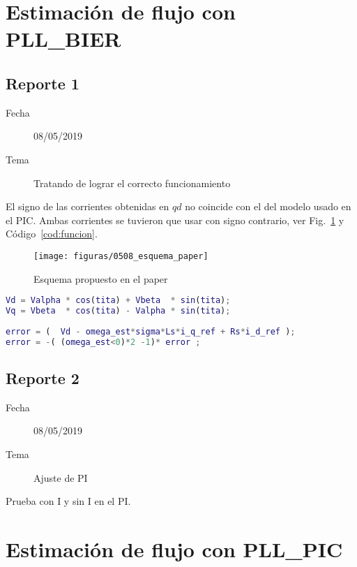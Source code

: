 \documentclass{article}
\begin{document}
	\section{Estimación de flujo con PLL\_BIER}
	
		
		\subsection{Reporte 1}
		\begin{description}
			\item[Fecha]  08/05/2019 
			\item[Tema] Tratando de lograr el correcto funcionamiento
		\end{description}
	
	
		El signo de las corrientes obtenidas en $qd$ no coincide con el del modelo usado en el PIC. Ambas corrientes se tuvieron que usar con signo contrario, ver Fig.~\ref{fig:esquemapaper} y Código~\ref{cod:funcion}.
		
		\begin{figure}
			\centering
			\texttt{[image: figuras/0508\_esquema\_paper]}
			\caption{Esquema propuesto en el paper}
			\label{fig:esquemapaper}
		\end{figure}
		
		\begin{lstlisting}[language=MATLAB,caption={Contenido de función de MATLAB},label=cod:funcion,]
Vd = Valpha * cos(tita) + Vbeta  * sin(tita);
Vq = Vbeta  * cos(tita) - Valpha * sin(tita);
          
error = (  Vd - omega_est*sigma*Ls*i_q_ref + Rs*i_d_ref );
error = -( (omega_est<0)*2 -1)* error ;		
		\end{lstlisting}
  		
  		
  		\subsection{Reporte 2}
  		\begin{description}
  			\item[Fecha]  08/05/2019 
  			\item[Tema] Ajuste de PI
  		\end{description}
		
		Prueba con I y sin I en el PI.
		
		
		
    \section{Estimación de flujo con PLL\_PIC}
		
\end{document}
